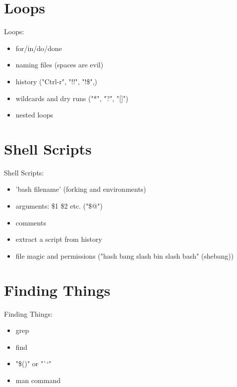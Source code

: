 \documentclass[
 size=12pt,
 paper=screen,
 mode=present,
 display=slidesnotes,
 style=paintings,
 nohandoutpagebreaks,
]{powerdot}
\begin{document}
\section[slide=false]{Loops}

\begin{slide}{Loops:}
  \begin{itemize}
     \item for/in/do/done
     \item naming files (spaces are evil)
     \item history ("Ctrl-r", "!!", "!\$",)
     \item wildcards and dry runs ("*", "?", "[]")
     \item nested loops
  \end{itemize}
\end{slide}

\section[slide=false]{Shell Scripts}

\begin{slide}{Shell Scripts:}
  \begin{itemize}
     \item 'bash filename' (forking and environments)
     \item arguments: \$1 \$2 etc. ("\$@")
     \item comments
     \item extract a script from history
     \item file magic and permissions ("hash bang slash bin slash bash" (shebang))
  \end{itemize}
\end{slide}

\section[slide=false]{Finding Things}

\begin{slide}{Finding Things:}
  \begin{itemize}
     \item grep
     \item find
     \item "\$()" or "``"
     \item man command
  \end{itemize}
\end{slide}
\end{document}
